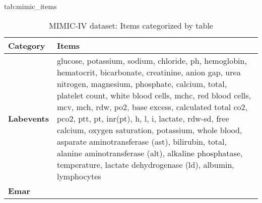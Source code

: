 \begin{table*}[h]
\floatconts
    {tab:mimic_items}
    {\caption{MIMIC-IV dataset: Items categorized by table}}
    {
        \begin{tabularx}{\textwidth}{lX}
            \toprule
            \textbf{Category} & \textbf{Items} \\
            \midrule
            \textbf{Labevents} & 
            glucose, potassium, sodium, chloride, ph, hemoglobin, hematocrit, bicarbonate, creatinine, anion gap, urea nitrogen, magnesium, phosphate, calcium, total, platelet count, white blood cells, mchc, red blood cells, mcv, mch, rdw, po2, base excess, calculated total co2, pco2, ptt, pt, inr(pt), h, l, i, lactate, rdw-sd, free calcium, oxygen saturation, potassium, whole blood, asparate aminotransferase (ast), bilirubin, total, alanine aminotransferase (alt), alkaline phosphatase, temperature, lactate dehydrogenase (ld), albumin, lymphocytes \\ 
            \midrule
            \textbf{Emar} & 

\end{tabularx}}
\end{table*}
